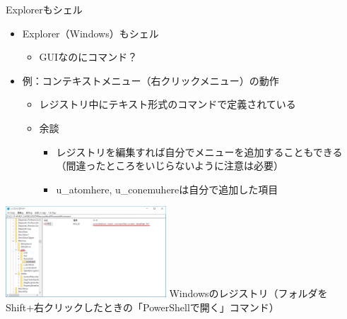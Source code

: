 \documentclass[12pt,aspectratio=169]{beamer}
\begin{document}
\begin{frame}{Explorerもシェル}

  \begin{minipage}{0.45\textwidth}
    \begin{itemize}
      \item Explorer（Windows）もシェル
        \begin{itemize}
          \item GUIなのにコマンド？
        \end{itemize}
      \item 例：コンテキストメニュー（右クリックメニュー）の動作
        \begin{itemize}
          \item レジストリ中にテキスト形式のコマンドで定義されている
          \item { \tiny 余談 }
            \begin{itemize}
              \item { \tiny レジストリを編集すれば自分でメニューを追加することもできる（間違ったところをいじらないように注意は必要） }
              \item { \tiny u\_atomhere, u\_conemuhereは自分で追加した項目 }
            \end{itemize}
        \end{itemize}
    \end{itemize}

  \end{minipage}
  \hfill
  \begin{minipage}{0.45\textwidth}
    \includegraphics[width=6cm,bb=0 0 659 481]{./images/regedit.png}
    { \tiny Windowsのレジストリ（フォルダをShift+右クリックしたときの「PowerShellで開く」コマンド） }
  \end{minipage}

\end{frame}
\end{document}
